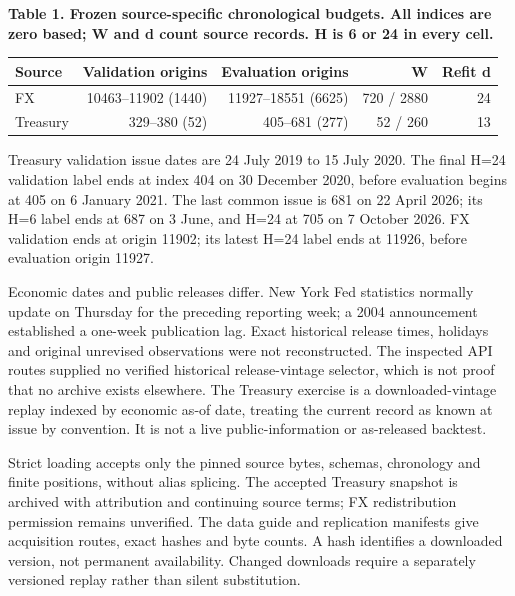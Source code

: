\documentclass[10pt,a4paper]{article}
\begin{document}
\begin{center}
\begin{minipage}{\linewidth}
\small\textbf{Table 1. Frozen source-specific chronological budgets. All indices are zero based; W and d count source records. H is 6 or 24 in every cell.}\par\medskip
\centering\fontsize{8}{10}\selectfont
\begin{tabular}{lrrrr}
\toprule
Source & Validation origins & Evaluation origins & W & Refit d \\
\midrule
FX & 10463–11902 (1440) & 11927–18551 (6625) & 720 / 2880 & 24 \\
Treasury & 329–380 (52) & 405–681 (277) & 52 / 260 & 13 \\
\bottomrule
\end{tabular}
\end{minipage}
\end{center}
Treasury validation issue dates are 24 July 2019 to 15 July 2020. The final H=24 validation label ends at index 404 on 30 December 2020, before evaluation begins at 405 on 6 January 2021. The last common issue is 681 on 22 April 2026; its H=6 label ends at 687 on 3 June, and H=24 at 705 on 7 October 2026. FX validation ends at origin 11902; its latest H=24 label ends at 11926, before evaluation origin 11927.

Economic dates and public releases differ. New York Fed statistics normally update on Thursday for the preceding reporting week; a 2004 announcement established a one-week publication lag. Exact historical release times, holidays and original unrevised observations were not reconstructed. The inspected API routes supplied no verified historical release-vintage selector, which is not proof that no archive exists elsewhere. The Treasury exercise is a downloaded-vintage replay indexed by economic as-of date, treating the current record as known at issue by convention. It is not a live public-information or as-released backtest.

Strict loading accepts only the pinned source bytes, schemas, chronology and finite positions, without alias splicing. The accepted Treasury snapshot is archived with attribution and continuing source terms; FX redistribution permission remains unverified. The data guide and replication manifests give acquisition routes, exact hashes and byte counts. A hash identifies a downloaded version, not permanent availability. Changed downloads require a separately versioned replay rather than silent substitution.
\end{document}
